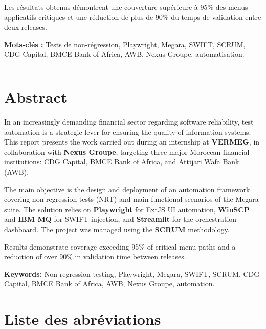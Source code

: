 \documentclass[12pt, a4paper]{report}
\begin{document}
Les résultats obtenus démontrent une couverture supérieure à 95\% des menus applicatifs critiques et une réduction de plus de 90\% du temps de validation entre deux releases.

\textbf{Mots-clés :} Tests de non-régression, Playwright, Megara, SWIFT, SCRUM, CDG Capital, BMCE Bank of Africa, AWB, Nexus Groupe, automatisation.

\bigskip\hrule\bigskip

\chapter*{Abstract}

In an increasingly demanding financial sector regarding software reliability, test automation is a strategic lever for ensuring the quality of information systems. This report presents the work carried out during an internship at \textbf{VERMEG}, in collaboration with \textbf{Nexus Groupe}, targeting three major Moroccan financial institutions: CDG Capital, BMCE Bank of Africa, and Attijari Wafa Bank (AWB).

The main objective is the design and deployment of an automation framework covering non-regression tests (NRT) and main functional scenarios of the Megara suite. The solution relies on \textbf{Playwright} for ExtJS UI automation, \textbf{WinSCP} and \textbf{IBM MQ} for SWIFT injection, and \textbf{Streamlit} for the orchestration dashboard. The project was managed using the \textbf{SCRUM} methodology.

Results demonstrate coverage exceeding 95\% of critical menu paths and a reduction of over 90\% in validation time between releases.

\textbf{Keywords:} Non-regression testing, Playwright, Megara, SWIFT, SCRUM, CDG Capital, BMCE Bank of Africa, AWB, Nexus Groupe, automation.

\newpage

{%
\setlength{\parskip}{0pt}
\tableofcontents
\listoffigures
\listoftables
}
\newpage

\chapter*{Liste des abréviations}
\end{document}
